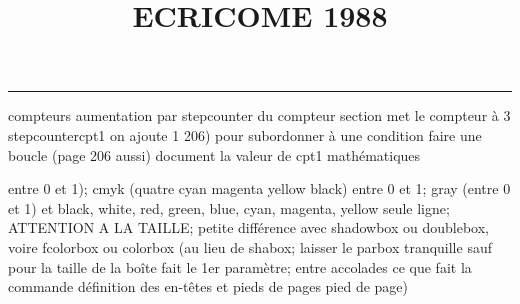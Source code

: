 \documentclass[11pt]{article}%
\title{\bf \vspace{-2cm} ECRICOME 1988} %
\author{} %
\date{} %
\renewcommand{\headrulewidth}{0pt}%
\renewcommand{\footrulewidth}{0.4pt}%
\begin{document}
\maketitle %
\vspace{-1.4cm}\hrule %
\thispagestyle{fancy}

\vspace*{.2cm}



compteurs%
aumentation par stepcounter du compteur section%
met le compteur à 3%
stepcounter{cpt1} on ajoute 1%
206) pour subordonner à une condition %
faire une boucle (page 206 aussi) %
document la valeur de cpt1 
mathématiques\newcommand{\ch}{\operatorname{ch}} 
\newcommand{\sh}{\operatorname{sh}}
\renewcommand{\tanh}{\operatorname{th}}
\renewcommand{\sinh}{\operatorname{sh}}
\renewcommand{\cosh}{\operatorname{ch}}
\newcommand{\argsh}{\operatorname{argsh}}
\newcommand{\argch}{\operatorname{argch}}
\newcommand{\argth}{\operatorname{argth}}
\newcommand{\Id}{\operatorname{Id}}
\renewcommand{\leq}{\leq}
\renewcommand{\geq}{\geq }

\newcommand{\dlim}{\lim}
\newcommand{\dsum}{\sum}
\newcommand{\dint}{\int}
\newcommand{\dprod}{\prod}



entre 0 et 1); cmyk (quatre cyan magenta yellow black) entre 0 et 1;
gray (entre 0 et 1) et black, white, red, green, blue, cyan, magenta,
yellow%
seule ligne; ATTENTION A LA TAILLE; petite différence avec shadowbox ou
doublebox, voire fcolorbox ou colorbox (au lieu de shabox; laisser le
parbox tranquille sauf pour la taille de la boîte
\newcommand{\Tbox}[1]{\begin{center} \shabox{\parbox{0.6
\linewidth}{#1}} \end{center}} %
fait le 1er paramètre; entre accolades ce que fait la commande
définition des en-têtes et pieds de pages\pagestyle{fancy}
\chead{}
\rfoot[ \ \thepage]{\thepage}
\cfoot{}
\lfoot{}
\thispagestyle{fancy} %
pied de page)\renewcommand{\footrulewidth}{0.4pt}
\renewcommand{\headrulewidth}{0.4pt}
\end{document}
